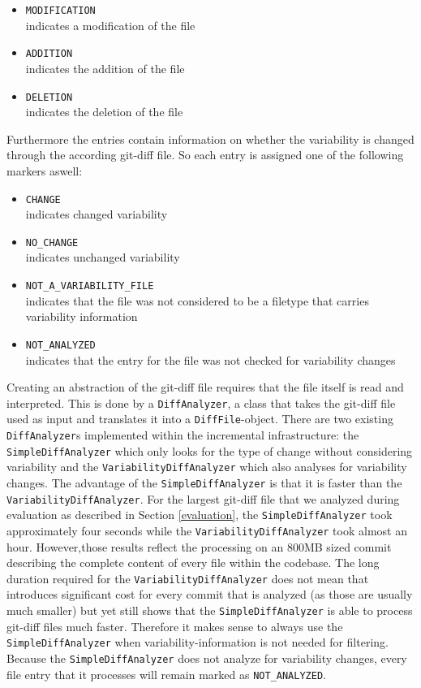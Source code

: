 \documentclass[a4paper]{article}
\begin{document}
\begin{itemize}
	\item \texttt{MODIFICATION} \\
	      indicates a modification of the file
	\item \texttt{ADDITION} \\
	      indicates the addition of the file
	\item \texttt{DELETION} \\
	      indicates the deletion of the file
\end{itemize}

Furthermore the entries contain information on whether the variability is changed through the according git-diff file. So each entry is assigned one of the following markers aswell:

\begin{itemize}
	\item \texttt{CHANGE} \\
	      indicates changed variability
	\item \texttt{NO\_CHANGE} \\
	      indicates unchanged variability
	\item \texttt{NOT\_A\_VARIABILITY\_FILE}\\
	      indicates that the file was not considered to be a filetype that carries variability information
	\item \texttt{NOT\_ANALYZED}\\
	      indicates that the entry for the file was not checked for variability changes
\end{itemize}

Creating an abstraction of the git-diff file requires that the file itself is read and interpreted. This is done by a \texttt{DiffAnalyzer}, a class that takes the git-diff file used as input and translates it into a \texttt{DiffFile}-object. There are two existing \texttt{DiffAnalyzer}s implemented within the incremental infrastructure: the \texttt{Simple\-Diff\-Analyzer} which only looks for the type of change without considering variability and the \texttt{Variability\-Diff\-Analyzer} which also analyses for variability changes. The advantage of the \texttt{Simple\-Diff\-Analyzer} is that it is faster than the \texttt{Variability\-Diff\-Analyzer}. For the largest git-diff file that we analyzed during evaluation as described in Section \ref{evaluation}, the \texttt{Simple\-Diff\-Analyzer} took approximately four seconds while the \texttt{Variability\-Diff\-Analyzer} took almost an hour. However,those results reflect the processing on an 800MB sized commit describing the complete content of every file within the codebase. The long duration required for the \texttt{Variability\-Diff\-Analyzer} does not mean that introduces significant cost for every commit that is analyzed (as those are usually much smaller) but yet still shows that the \texttt{Simple\-Diff\-Analyzer} is able to process git-diff files much faster.
Therefore it makes sense to always use the \texttt{Simple\-Diff\-Analyzer} when variability-information is not needed for filtering. Because the \texttt{Simple\-Diff\-Analyzer} does not analyze for variability changes, every file entry that it processes will remain marked as \texttt{NOT\_ANALYZED}.
\end{document}
